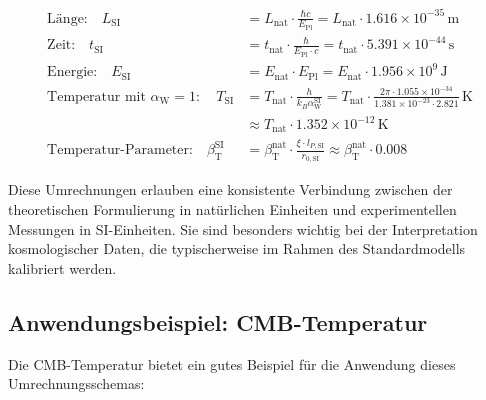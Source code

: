 \documentclass[12pt,a4paper]{article}
\newcommand{\betaT}{\beta_{\text{T}}}
\newcommand{\alphaW}{\alpha_{\text{W}}}
\begin{document}
\begin{tcolorbox}[colback=blue!5!white,colframe=blue!75!black,title={Umrechnungsschema zwischen Einheitensystemen}]
	\begin{align}
		\text{Länge:} \quad L_{\text{SI}} &= L_{\text{nat}} \cdot \frac{\hbar c}{E_{\text{Pl}}} = L_{\text{nat}} \cdot 1.616 \times 10^{-35} \, \text{m} \\
		\text{Zeit:} \quad t_{\text{SI}} &= t_{\text{nat}} \cdot \frac{\hbar}{E_{\text{Pl}} \cdot c} = t_{\text{nat}} \cdot 5.391 \times 10^{-44} \, \text{s} \\
		\text{Energie:} \quad E_{\text{SI}} &= E_{\text{nat}} \cdot E_{\text{Pl}} = E_{\text{nat}} \cdot 1.956 \times 10^9 \, \text{J} \\
		\text{Temperatur mit } \alphaW = 1: \quad T_{\text{SI}} &= T_{\text{nat}} \cdot \frac{h}{k_B \alphaW^{\text{SI}}} = T_{\text{nat}} \cdot \frac{2\pi \cdot 1.055 \times 10^{-34}}{1.381 \times 10^{-23} \cdot 2.821} \, \text{K} \\
		&\approx T_{\text{nat}} \cdot 1.352 \times 10^{-12} \, \text{K} \\
		\text{Temperatur-Parameter:} \quad \betaT^{\text{SI}} &= \betaT^{\text{nat}} \cdot \frac{\xi \cdot l_{P,\text{SI}}}{r_{0,\text{SI}}} \approx \betaT^{\text{nat}} \cdot 0.008
	\end{align}
\end{tcolorbox}

Diese Umrechnungen erlauben eine konsistente Verbindung zwischen der theoretischen Formulierung in natürlichen Einheiten und experimentellen Messungen in SI-Einheiten. Sie sind besonders wichtig bei der Interpretation kosmologischer Daten, die typischerweise im Rahmen des Standardmodells kalibriert werden.

\subsection{Anwendungsbeispiel: CMB-Temperatur}

Die CMB-Temperatur bietet ein gutes Beispiel für die Anwendung dieses Umrechnungsschemas:
\end{document}
